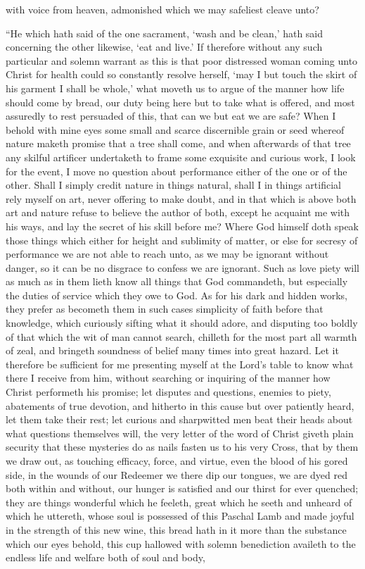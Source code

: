 with voice from heaven, admonished which we may safeliest cleave unto?

“He which hath said of the one sacrament, ‘wash and be clean,’ hath said concerning the other likewise, ‘eat and live.’ If therefore without any such particular and solemn warrant as this is that poor distressed woman coming unto Christ for health could so constantly resolve herself, ‘may I but touch the skirt of his garment I shall be whole,’ what moveth us to argue of the manner how life should come by bread, our duty being here but to take what is offered, and most assuredly to rest persuaded of this, that can we but eat we are safe? When I behold with mine eyes some small and scarce discernible grain or seed whereof nature maketh promise that a tree shall come, and when afterwards of that tree any skilful artificer undertaketh to frame some exquisite and curious work, I look for the event, I move no question about performance either of the one or of the other. Shall I simply credit nature in things natural, shall  I in things artificial rely myself on art, never offering to make doubt, and in that which is above both art and nature refuse to believe the author of both, except he acquaint me with his ways, and lay the secret of his skill before me? Where God himself doth speak those things which either for height and sublimity of matter, or else for secresy of performance we are not able to reach unto, as we may be ignorant without danger, so it can be no disgrace to confess we are ignorant. Such as love piety will as much as in them lieth know all things that God commandeth, but especially the duties of service which they owe to God. As for his dark and hidden works, they prefer as becometh them in such cases simplicity of faith before that knowledge, which curiously sifting what it should adore, and disputing too boldly of that which the wit of man cannot search, chilleth for the most part all warmth of zeal, and bringeth soundness of belief many times into great hazard. Let it therefore be sufficient for me presenting myself at the Lord’s table to know what there I receive from him, without searching or inquiring of the manner how Christ performeth his promise; let disputes and questions, enemies to piety, abatements of true devotion, and hitherto in this cause but over patiently heard, let them take their rest; let curious and sharpwitted men beat their heads about what questions themselves will, the very letter of the word of Christ giveth plain security that these mysteries do as nails fasten us to his very Cross, that by them we draw out, as touching efficacy, force, and virtue, even the blood of his gored side, in the wounds of our Redeemer we there dip our tongues, we are dyed red both within and without, our hunger is satisfied and our thirst for ever quenched; they are things wonderful which he feeleth, great which he seeth and unheard of which he uttereth, whose soul is possessed of this Paschal Lamb and made joyful in the strength of this new wine, this bread hath in it more than the substance which our eyes behold, this cup hallowed with solemn benediction availeth to the  endless life and welfare both of soul and body,
